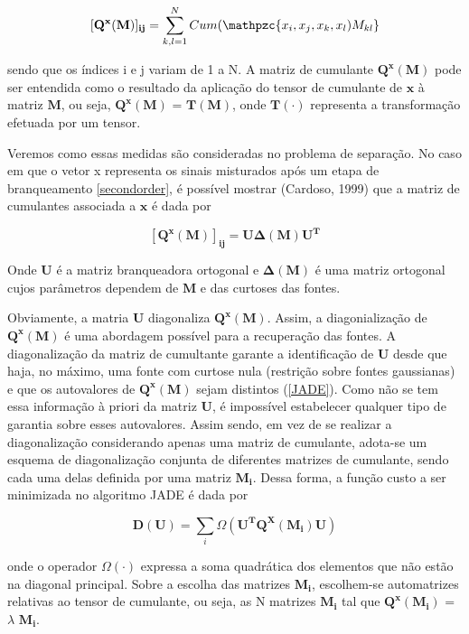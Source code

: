     \begin{equation}
        \mathbf{[Q^x(M)]_{ij}} = \sum_{k,l=1}^N Cum(\mathpzc{x_i,x_j,x_k,x_l)M_{kl}}
    \end{equation}
    
    sendo que os índices i e j variam de 1 a N. A matriz de cumulante $\mathbf{Q^x(M)}$ pode ser entendida como o resultado da aplicação do tensor de cumulante de $\mathbf{x}$ à matriz $\mathbf{M}$, ou seja, $\mathbf{Q^x(M)}$ = $\mathbf{T(M)}$, onde $\mathbf{T(\cdot)}$ representa a transformação efetuada por um tensor.
    
    Veremos como essas medidas são consideradas no problema de separação. No caso em que o vetor x representa os sinais misturados após um etapa de branqueamento \ref{secondorder}, é possível mostrar (Cardoso, 1999) que a matriz de cumulantes associada a $\mathbf{x}$ é dada por
    
    \begin{equation}
        \mathbf{[Q^x(M)]_{ij}} = \mathbf{U\Delta(M)U^T}
    \end{equation}
    
    Onde $\mathbf{U}$ é a matriz branqueadora ortogonal e  $\mathbf{\Delta(M)}$ é uma matriz ortogonal cujos parâmetros dependem de $\mathbf{M}$ e das curtoses das fontes.

    Obviamente, a matria $\mathbf{U}$ diagonaliza  $\mathbf{Q^x(M)}$. Assim, a diagonialização de $\mathbf{Q^x(M)}$ é uma abordagem possível para a recuperação das fontes.  A diagonalização da matriz de cumultante garante a identificação de $\mathbf{U}$ desde que haja, no máximo, uma fonte com curtose nula (restrição sobre fontes gaussianas) e que os autovalores de $\mathbf{Q^x(M)}$ sejam distintos (\ref{JADE}). Como não se tem essa informação à priori da matriz $\mathbf{U}$, é impossível estabelecer qualquer tipo de garantia sobre esses autovalores.
    Assim sendo, em vez de se realizar a diagonalização considerando apenas uma matriz de cumulante, adota-se um esquema de diagonalização conjunta de diferentes matrizes de cumulante, sendo cada uma delas definida por uma matriz $\mathbf{M_i}$. Dessa forma, a função custo a ser minimizada no algoritmo JADE é dada por
    
    \begin{equation}\label{eq:optimize}
        \mathbf{D(U)} = \sum_i \Omega(\mathbf{U^TQ^X(M_i)U})
    \end{equation}
    
    onde o operador $\Omega(\cdot)$ expressa a soma quadrática dos elementos que não estão na diagonal principal. Sobre a escolha das matrizes $\mathbf{M_i}$, escolhem-se automatrizes relativas ao tensor de cumulante, ou seja, as N matrizes $\mathbf{M_i}$ tal que $\mathbf{Q^x(M_i)}$ = $\lambda$ $\mathbf{M_i}$.
    
